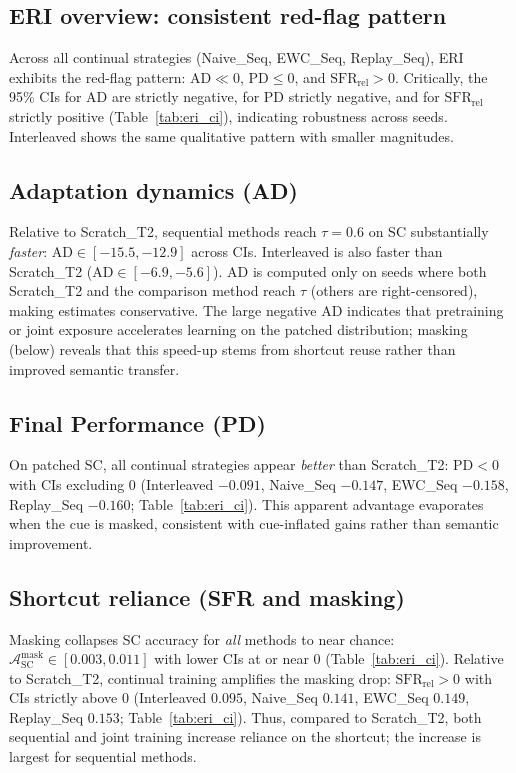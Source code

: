 \documentclass[conference]{IEEEtran}
\begin{document}
\subsection{ERI overview: consistent red-flag pattern}
Across all continual strategies (Naive\_Seq, EWC\_Seq, Replay\_Seq), ERI exhibits the red-flag pattern: \(\mathrm{AD}\ll 0\), \(\mathrm{PD}\le 0\), and \(\mathrm{SFR}_{\mathrm{rel}}>0\). Critically, the 95\% CIs for AD are strictly negative, for PD strictly negative, and for \(\mathrm{SFR}_{\mathrm{rel}}\) strictly positive (Table~\ref{tab:eri_ci}), indicating robustness across seeds. Interleaved shows the same qualitative pattern with smaller magnitudes.

\subsection{Adaptation dynamics (AD)}
Relative to Scratch\_T2, sequential methods reach \(\tau{=}0.6\) on SC substantially \emph{faster}: \(\mathrm{AD}\in[-15.5,-12.9]\) across CIs. Interleaved is also faster than Scratch\_T2 (\(\mathrm{AD}\in[-6.9,-5.6]\)). AD is computed only on seeds where both Scratch\_T2 and the comparison method reach \(\tau\) (others are right-censored), making estimates conservative. The large negative AD indicates that pretraining or joint exposure accelerates learning on the patched distribution; masking (below) reveals that this speed-up stems from shortcut reuse rather than improved semantic transfer.

\subsection{Final Performance (PD)}
On patched SC, all continual strategies appear \emph{better} than Scratch\_T2: \(\mathrm{PD}<0\) with CIs excluding 0 (Interleaved \(-0.091\), Naive\_Seq \(-0.147\), EWC\_Seq \(-0.158\), Replay\_Seq \(-0.160\); Table~\ref{tab:eri_ci}). This apparent advantage evaporates when the cue is masked, consistent with cue-inflated gains rather than semantic improvement.

\subsection{Shortcut reliance (SFR and masking)}
Masking collapses SC accuracy for \emph{all} methods to near chance: \(\mathcal{A}_{\text{SC}}^{\text{mask}}\in[0.003,0.011]\) with lower CIs at or near 0 (Table~\ref{tab:eri_ci}). Relative to Scratch\_T2, continual training amplifies the masking drop: \(\mathrm{SFR}_{\mathrm{rel}}>0\) with CIs strictly above 0 (Interleaved \(0.095\), Naive\_Seq \(0.141\), EWC\_Seq \(0.149\), Replay\_Seq \(0.153\); Table~\ref{tab:eri_ci}). Thus, compared to Scratch\_T2, both sequential and joint training increase reliance on the shortcut; the increase is largest for sequential methods.
\end{document}

